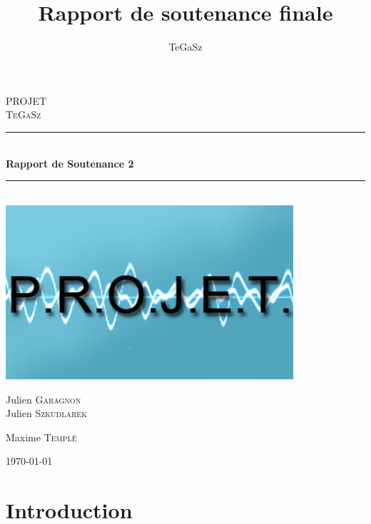 \documentclass[12pt,a4paper]{report}
\title{Rapport de soutenance finale}
\date{}
\author{TeGaSz}
\newcommand{\HRule}{\rule{\linewidth}{0.5mm}}
\begin{document}
\begin{titlepage}



\begin{center}



\textsc{\LARGE PROJET}\\[1.5cm]

\textsc{\Large TeGaSz}\\[0.5cm]


\HRule \\[0.4cm]
{ \huge \bfseries Rapport de Soutenance 2}\\[0.4cm]
  
\HRule \\[1.5cm]
\includegraphics[width=0.8\textwidth]{./name.jpg}\\[1cm]  
\begin{minipage}{0.4\textwidth}
\begin{flushleft} \large
Julien \textsc{Garagnon}\\
Julien \textsc{Szkudlarek}
\end{flushleft}
\end{minipage}
\begin{minipage}{0.4\textwidth}
\begin{flushright} \large
Maxime \textsc{Templé}\\

\end{flushright}
\end{minipage}

\vfill

{\large \today}

\end{center}

\end{titlepage}
\tableofcontents

\chapter{Introduction}
\end{document}
